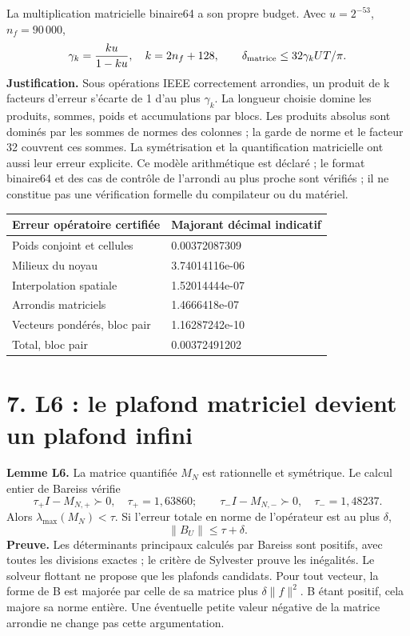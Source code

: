 \documentclass[
  10pt,
  a4paper,
]{article}
\begin{document}
La multiplication matricielle binaire64 a son propre budget. Avec
\(u=2^{-53}\), \(n_f=90\,000\), \[
\gamma_k=\frac{ku}{1-ku},\quad k=2n_f+128,\qquad
\delta_{\rm matrice}\le32\gamma_kUT/\pi.
\] \textbf{Justification.} Sous opérations IEEE correctement arrondies,
un produit de k facteurs d'erreur s'écarte de 1 d'au plus \(\gamma_k\).
La longueur choisie domine les produits, sommes, poids et accumulations
par blocs. Les produits absolus sont dominés par les sommes de normes
des colonnes ; la garde de norme et le facteur 32 couvrent ces sommes.
La symétrisation et la quantification matricielle ont aussi leur erreur
explicite. Ce modèle arithmétique est déclaré ; le format binaire64 et
des cas de contrôle de l'arrondi au plus proche sont vérifiés ; il ne
constitue pas une vérification formelle du compilateur ou du matériel.

\begin{longtable}[]{@{}ll@{}}
\toprule\noalign{}
Erreur opératoire certifiée & Majorant décimal indicatif \\
\midrule\noalign{}
\endhead
\bottomrule\noalign{}
\endlastfoot
Poids conjoint et cellules & 0.00372087309 \\
Milieux du noyau & 3.74014116e-06 \\
Interpolation spatiale & 1.52014444e-07 \\
Arrondis matriciels & 1.4666418e-07 \\
Vecteurs pondérés, bloc pair & 1.16287242e-10 \\
Total, bloc pair & 0.00372491202 \\
\end{longtable}

\hypertarget{l6-le-plafond-matriciel-devient-un-plafond-infini}{%
\section{7. L6 : le plafond matriciel devient un plafond
infini}\label{l6-le-plafond-matriciel-devient-un-plafond-infini}}

\textbf{Lemme L6.} La matrice quantifiée \(M_N\) est rationnelle et
symétrique. Le calcul entier de Bareiss vérifie \[
\tau_+I-M_{N,+}\succ0,\quad \tau_+=1{,}63860;
\qquad \tau_-I-M_{N,-}\succ0,\quad \tau_-=1{,}48237.
\] Alors \(\lambda_{\max}(M_N)<\tau\). Si l'erreur totale en norme de
l'opérateur est au plus \(\delta\), \[
\|B_U\|\le\tau+\delta.
\] \textbf{Preuve.} Les déterminants principaux calculés par Bareiss
sont positifs, avec toutes les divisions exactes ; le critère de
Sylvester prouve les inégalités. Le solveur flottant ne propose que les
plafonds candidats. Pour tout vecteur, la forme de B est majorée par
celle de sa matrice plus \(\delta\|f\|^2\). B étant positif, cela majore
sa norme entière. Une éventuelle petite valeur négative de la matrice
arrondie ne change pas cette argumentation.
\end{document}
